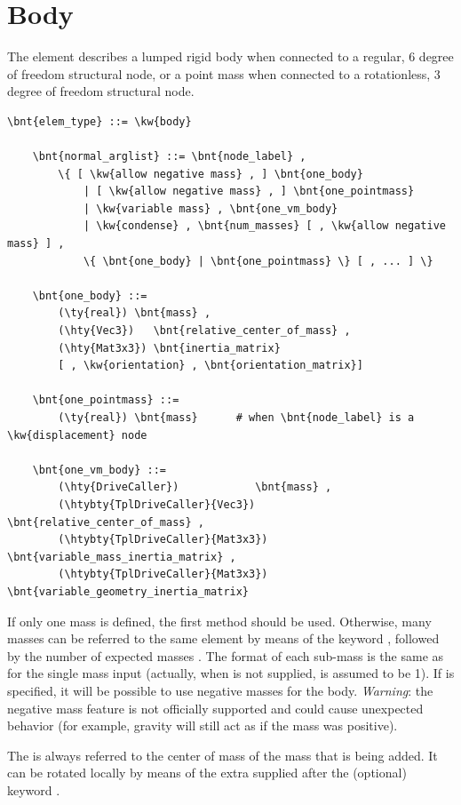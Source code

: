 \section{Body}
\label{sec:EL:BODY}
The  element describes a lumped rigid body when connected 
to a regular, 6 degree of freedom structural node, or a point mass
when connected to a rotationless, 3 degree of freedom structural node.
\begin{Verbatim}[commandchars=\\\{\}]
    \bnt{elem_type} ::= \kw{body}

    \bnt{normal_arglist} ::= \bnt{node_label} ,
        \{ [ \kw{allow negative mass} , ] \bnt{one_body}
            | [ \kw{allow negative mass} , ] \bnt{one_pointmass}
            | \kw{variable mass} , \bnt{one_vm_body}
            | \kw{condense} , \bnt{num_masses} [ , \kw{allow negative mass} ] ,
	        \{ \bnt{one_body} | \bnt{one_pointmass} \} [ , ... ] \}

    \bnt{one_body} ::=
        (\ty{real}) \bnt{mass} , 
        (\hty{Vec3})   \bnt{relative_center_of_mass} ,
        (\hty{Mat3x3}) \bnt{inertia_matrix}
        [ , \kw{orientation} , \bnt{orientation_matrix}]

    \bnt{one_pointmass} ::=
        (\ty{real}) \bnt{mass}      # when \bnt{node_label} is a \kw{displacement} node

    \bnt{one_vm_body} ::=
        (\hty{DriveCaller})            \bnt{mass} ,
        (\htybty{TplDriveCaller}{Vec3})   \bnt{relative_center_of_mass} ,
        (\htybty{TplDriveCaller}{Mat3x3}) \bnt{variable_mass_inertia_matrix} ,
        (\htybty{TplDriveCaller}{Mat3x3}) \bnt{variable_geometry_inertia_matrix}
\end{Verbatim}
If only one mass is defined, the first method should be used. Otherwise,
many masses can be referred to the same element by means of the keyword
, followed by the number of expected masses .
The format of each sub-mass is the same as for the single mass input (actually, 
when  is not supplied,  is assumed to be 1).
If  is specified, it will be possible to use
negative masses for the body. \textit{Warning}: the negative mass feature
is not officially supported and could cause unexpected behavior (for
example, gravity will still act as if the mass was positive).

The  is always referred to the center of mass of the
mass that is being added. It can be rotated locally by means of the extra
 supplied after the (optional) keyword 
.

